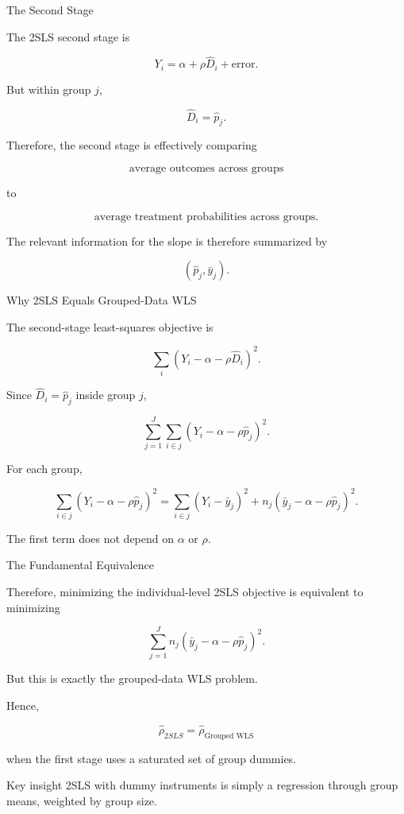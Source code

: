 \documentclass[aspectratio=169]{beamer}
\begin{document}
\begin{frame}{The Second Stage}

The 2SLS second stage is

\[
Y_i
=
\alpha+\rho\hat D_i+\text{error}.
\]

But within group \(j\),

\[
\hat D_i=\hat p_j.
\]

Therefore, the second stage is effectively comparing

\[
\boxed{
\text{average outcomes across groups}
}
\]

to

\[
\boxed{
\text{average treatment probabilities across groups}.
}
\]

The relevant information for the slope is therefore summarized by

\[
(\hat p_j,\bar y_j).
\]

\end{frame}

\begin{frame}{Why 2SLS Equals Grouped-Data WLS}

The second-stage least-squares objective is

\[
\sum_i
\left(
Y_i-\alpha-\rho\hat D_i
\right)^2.
\]

Since \(\hat D_i=\hat p_j\) inside group \(j\),

\[
\sum_{j=1}^J
\sum_{i\in j}
\left(
Y_i-\alpha-\rho\hat p_j
\right)^2.
\]

For each group,

\[
\sum_{i\in j}
\left(
Y_i-\alpha-\rho\hat p_j
\right)^2
=
\sum_{i\in j}(Y_i-\bar y_j)^2
+
n_j
(\bar y_j-\alpha-\rho\hat p_j)^2.
\]

The first term does not depend on \(\alpha\) or \(\rho\).

\end{frame}

\begin{frame}{The Fundamental Equivalence}

Therefore, minimizing the individual-level 2SLS objective is equivalent to minimizing

\[
\sum_{j=1}^J
n_j
(\bar y_j-\alpha-\rho\hat p_j)^2.
\]

But this is exactly the grouped-data WLS problem.

Hence,

\[
\boxed{
\hat\rho_{2SLS}
=
\hat\rho_{\text{Grouped WLS}}
}
\]

when the first stage uses a saturated set of group dummies.

\vspace{0.5cm}

\begin{block}{Key insight}
2SLS with dummy instruments is simply a regression through group means, weighted by group size.
\end{block}

\end{frame}
\end{document}
